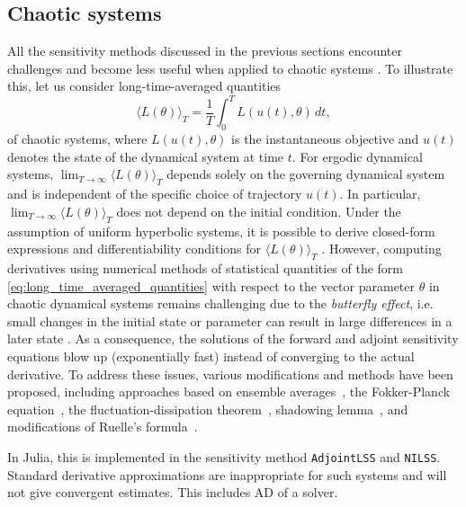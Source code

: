 \subsection{Chaotic systems}


All the sensitivity methods discussed in the previous sections encounter challenges and become less useful when applied to chaotic systems \cite{Wang2012-chaos-adjoint}.
To illustrate this, let us consider long-time-averaged quantities 
\begin{equation}\label{eq:long_time_averaged_quantities}
    \langle L(\theta) \rangle_T = \frac{1}{T} \int_0^T L(u(t), \theta) \, dt, 
\end{equation}
of chaotic systems, where $L(u(t), \theta)$ is the instantaneous objective and $u(t)$ denotes the state of the dynamical system at time $t$.
For ergodic dynamical systems, $\lim_{T\to\infty} \langle L(\theta) \rangle_T$ depends solely on the governing dynamical system and is independent of the specific choice of trajectory $u(t)$. 
In particular, $\lim_{T\to\infty} \langle L(\theta) \rangle_T$ does not depend on the initial condition. 
Under the assumption of uniform hyperbolic systems, it is possible to derive closed-form expressions and differentiability conditions for $ \langle L(\theta) \rangle_T$ \cite{ruelle1997differentiation,ruelle2009review}.
However, computing derivatives using numerical methods of statistical quantities of the form \eqref{eq:long_time_averaged_quantities} with respect to the vector parameter $\theta$ in chaotic dynamical systems remains challenging due to the \textit{butterfly effect}, i.e. small changes in the initial state or parameter can result in large differences in a later state \cite{Lorenz.1963}.
As a consequence, the solutions of the forward and adjoint sensitivity equations blow up (exponentially fast) instead of converging to the actual derivative.
To address these issues, various modifications and methods have been proposed, including approaches based on ensemble averages~\cite{lea2000sensitivity, eyink2004ruelle}, the Fokker-Planck equation~\cite{thuburn2005climate, blonigan2014probability}, the fluctuation-dissipation theorem~\cite{leith1975climate, abramov2007blended, abramov2008new}, shadowing lemma~\cite{wang2013forward, wang2014least, wang2014convergence, ni2017sensitivity, blonigan2017adjoint, blonigan2018multiple, ni2019adjoint, ni2019sensitivity}, and modifications of Ruelle's formula~\cite{chandramoorthy2022efficient, ni2020fast}.

In Julia, this is implemented in the sensitivity method \texttt{AdjointLSS} and \texttt{NILSS}. 
Standard derivative approximations are inappropriate for such systems and will not give convergent estimates.
This includes AD of a solver.